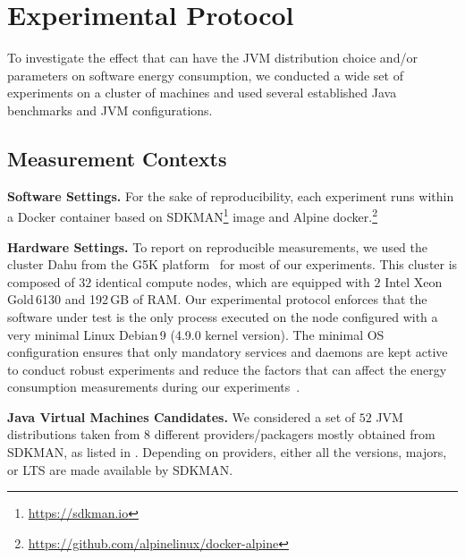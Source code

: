 \section{Experimental Protocol}\label{sec:javaprotocol}
To investigate the effect that can have the JVM distribution choice and/or parameters on software energy consumption, we conducted a wide set of experiments on a cluster of machines and used several established Java benchmarks and JVM configurations.

\subsection{Measurement Contexts}

\noindent\textbf{Software Settings.}
For the sake of reproducibility, each experiment runs within a Docker container based on \textsf{SDKMAN}\footnote{\url{https://sdkman.io}} image and Alpine docker.\footnote{\url{https://github.com/alpinelinux/docker-alpine}}

\vspace{6pt}
\noindent\textbf{Hardware Settings.}
To report on reproducible measurements, we used the cluster \textsf{Dahu} from the G5K platform~\cite{grid5000} for most of our experiments.
This cluster is composed of $32$ identical compute nodes, which are equipped with $2$ Intel Xeon\,Gold\,6130 and 192\,GB of RAM.
Our experimental protocol enforces that the software under test is the only process executed on the node configured with a very minimal Linux Debian\,9 (4.9.0 kernel version).
The minimal OS configuration ensures that only mandatory services and daemons are kept active to conduct robust experiments and reduce the factors that can affect the energy consumption measurements during our experiments~\cite{opaper}.

\vspace{6pt}
\noindent\textbf{Java Virtual Machines Candidates.}
We considered a set of $52$ JVM distributions taken from $8$ different providers/packagers mostly obtained from \textsf{SDKMAN}, as listed in .
Depending on providers, either all the versions, majors, or LTS are made available by \textsf{SDKMAN}.

